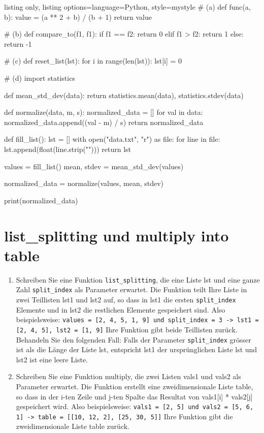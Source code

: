 \documentclass[11pt, oneside]{book}
\begin{document}
\begin{tcblisting}{listing only, listing options={language=Python, style=mystyle}}
# (a)
def func(a, b):
    value = (a ** 2 + b) / (b + 1)
    return value

# (b)
def compare_to(f1, f1):
    if f1 == f2:
        return 0
    elif f1 > f2:
        return 1
    else:
        return -1
    
# (c)
def reset_list(lst):
    for i in range(len(lst)):
        lst[i] = 0

# (d)
import statistics

def mean_std_dev(data):
    return statistics.mean(data), statistics.stdev(data)

def normalize(data, m, s):
    normalized_data = []
    for val in data:
        normalized_data.append((val - m) / s)
    return normalized_data

def fill_list():
    lst = []
    with open("data.txt", "r") as file:
        for line in file:
            lst.append(float(line.strip("\n")))
    return lst

values = fill_list()
mean, stdev = mean_std_dev(values)

normalized_data = normalize(values, mean, stdev)

print(normalized_data)
\end{tcblisting}

\newpage
\section{list\_splitting und multiply into table}

\begin{enumerate}[label=(\alph*)]
    \item Schreiben Sie eine Funktion \texttt{list\_splitting}, die eine Liste lst und eine ganze Zahl \texttt{split\_index} als Parameter erwartet. Die Funktion teilt Ihre Liste in zwei Teillisten lst1 und lst2 auf, so dass in lst1 die ersten \texttt{split\_index} Elemente und in lst2 die restlichen Elemente gespeichert sind. Also beispielsweise: \newline
    \texttt{values = [2, 4, 5, 1, 9] und split\_index = 3 \newline
    -> lst1 = [2, 4, 5], lst2 = [1, 9]} \newline
    Ihre Funktion gibt beide Teillisten zurück. Behandeln Sie den folgenden Fall: Falls der Parameter \texttt{split\_index} grösser ist als die Länge der Liste lst, entspricht lst1 der ursprünglichen Liste lst und lst2 ist eine leere Liste.
    \item Schreiben Sie eine Funktion multiply, die zwei Listen vals1 und vals2 als Parameter erwartet. Die Funktion erstellt eine zweidimensionale Liste table, so dass in der i-ten Zeile und j-ten Spalte das Resultat von vals1[i] * vals2[j] gespeichert wird. Also beispielsweise: \newline
    \texttt{vals1 = [2, 5] und vals2 = [5, 6, 1] \newline
    -> table = [[10, 12, 2], [25, 30, 5]]} \newline
    Ihre Funktion gibt die zweidimensionale Liste table zurück.
\end{enumerate}
\end{document}
